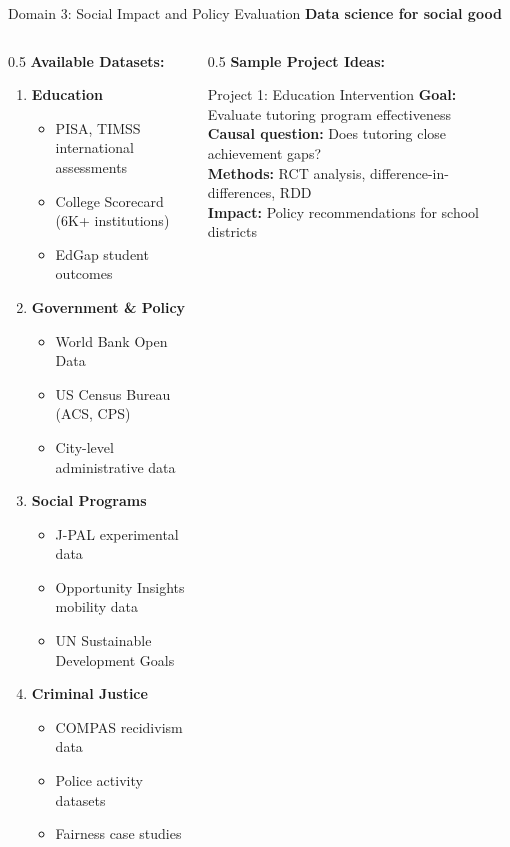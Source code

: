 \begin{frame}{Domain 3: Social Impact and Policy Evaluation}
\textbf{Data science for social good}

\begin{columns}
\begin{column}{0.5\textwidth}
\textbf{Available Datasets:}

\begin{enumerate}
\item \textbf{Education}
   \begin{itemize}
   \item PISA, TIMSS international assessments
   \item College Scorecard (6K+ institutions)
   \item EdGap student outcomes
   \end{itemize}

\item \textbf{Government \& Policy}
   \begin{itemize}
   \item World Bank Open Data
   \item US Census Bureau (ACS, CPS)
   \item City-level administrative data
   \end{itemize}

\item \textbf{Social Programs}
   \begin{itemize}
   \item J-PAL experimental data
   \item Opportunity Insights mobility data
   \item UN Sustainable Development Goals
   \end{itemize}

\item \textbf{Criminal Justice}
   \begin{itemize}
   \item COMPAS recidivism data
   \item Police activity datasets
   \item Fairness case studies
   \end{itemize}
\end{enumerate}
\end{column}

\begin{column}{0.5\textwidth}
\textbf{Sample Project Ideas:}

\begin{block}{Project 1: Education Intervention}
\textbf{Goal:} Evaluate tutoring program effectiveness\\
\textbf{Causal question:} Does tutoring close achievement gaps?\\
\textbf{Methods:} RCT analysis, difference-in-differences, RDD\\
\textbf{Impact:} Policy recommendations for school districts
\end{block}


\end{column}
\end{columns}
\end{frame}
